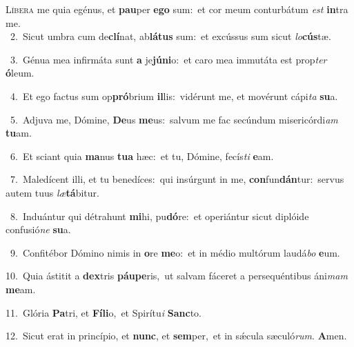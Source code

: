 \lettrine{\initial\textcolor{\initialcolor}{L}}{íbera} me quia egénus, et \textbf{pau}\-per \textbf{e}\-\textbf{go} sum:~\star et cor meum conturbátum \textit{est} \textbf{in}\-tra me.\\
{\numbfont\textcolor{\numbcolor}{~2.}}~Sicut umbra cum de\-\textbf{clí}\-nat, ab\-\textbf{lá}\-\textbf{tus} sum:~\star et excússus sum sicut \textit{lo}\-\textbf{cús}tæ.\par
{\numbfont\textcolor{\numbcolor}{~3.}}~Génua mea infirmáta sunt \textbf{a} je\-\textbf{jú}\-\textbf{ni}o:~\star et caro mea immutáta est prop\textit{ter} \textbf{ó}\-leum.\par
{\numbfont\textcolor{\numbcolor}{~4.}}~Et ego factus sum op\-\textbf{pró}\-brium \textbf{il}\-lis:~\star vidérunt me, et movérunt cápi\textit{ta} \textbf{su}\-a.\par
{\numbfont\textcolor{\numbcolor}{~5.}}~Adjuva me, Dómine, \textbf{De}\-us \textbf{me}\-us:~\star salvum me fac secúndum misericórdi\textit{am} \textbf{tu}\-am.\par
{\numbfont\textcolor{\numbcolor}{~6.}}~Et sciant quia \textbf{ma}\-nus \textbf{tu}\-\textbf{a} hæc:~\star et tu, Dómine, fecís\textit{ti} \textbf{e}\-am.\par
{\numbfont\textcolor{\numbcolor}{~7.}}~Maledícent illi, et tu benedíces:~\dagger qui insúrgunt in me, \textbf{con}\-fun\-\textbf{dán}\-tur:~\star servus autem tuus \textit{læ}\-\textbf{tá}bitur.\par
{\numbfont\textcolor{\numbcolor}{~8.}}~Induántur qui détrahunt \textbf{mi}\-hi, pu\-\textbf{dó}\-re:~\star et operiántur sicut diplóide confusió\textit{ne} \textbf{su}\-a.\par
{\numbfont\textcolor{\numbcolor}{~9.}}~Confitébor Dómino nimis in \textbf{o}\-re \textbf{me}\-o:~\star et in médio multórum laudá\textit{bo} \textbf{e}\-um.\par
{\numbfont\textcolor{\numbcolor}{10.}}~Quia ástitit a \textbf{dex}\-tris \textbf{páu}\-\textbf{pe}ris,~\star ut salvam fáceret a persequéntibus áni\textit{mam} \textbf{me}\-am.\par
{\numbfont\textcolor{\numbcolor}{11.}}~Glória \textbf{Pa}\-tri, et \textbf{Fí}\-\textbf{li}o,~\star et Spirítu\textit{i} \textbf{Sanc}\-to.\par
{\numbfont\textcolor{\numbcolor}{12.}}~Sicut erat in princípio, et \textbf{nunc}\-, et \textbf{sem}\-per,~\star et in sǽcula sæculó\-\textit{rum}\-. \textbf{A}\-men.\par
